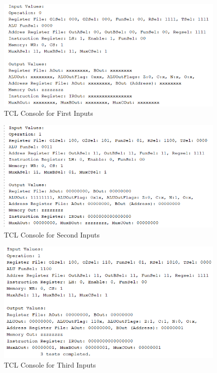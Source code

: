 \documentclass[pdftex,12pt,a4paper]{article}
\begin{document}
\begin{figure}[H]
	\centering
	\includegraphics[width=1\textwidth]{results/alu_system_1.png}	
	\caption{TCL Console for First Inputs}
	\label{TCL Console for First Inputs}
\end{figure}


\begin{figure}[H]
	\centering
	\includegraphics[width=1\textwidth]{results/alu_system_2.png}	
	\caption{TCL Console for Second Inputs}
	\label{TCL Console for Second Inputs}
\end{figure}


\begin{figure}[H]
	\centering
	\includegraphics[width=1\textwidth]{results/alu_system_3.png}	
	\caption{TCL Console for Third Inputs}
	\label{TCL Console for Third Inputs}
\end{figure}
\end{document}
